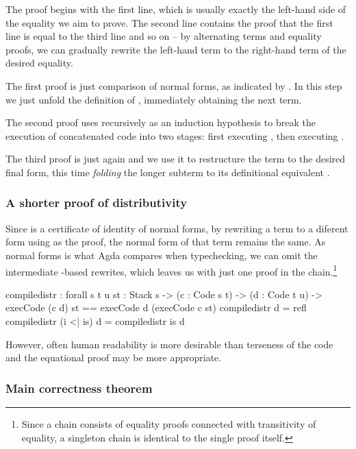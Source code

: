 \noindent The proof begins with the first line, which is usually exactly the
left-hand side of the equality we aim
to prove.  The second line contains the proof that the first line is equal to
the third line and so on -- by alternating terms and equality proofs, we can
gradually rewrite the left-hand term to the right-hand term of the desired
equality.

The first proof is just comparison of normal forms, as indicated by
. In this step we just unfold the definition of ,
immediately obtaining the next term.

The second proof uses  recursively as an induction
hypothesis to break the execution of concatenated code into two stages: first
executing , then executing .

The third proof is just  again and we use it to restructure the
term to the desired final form, this time \emph{folding} the longer
subterm to its definitional equivalent .

\subsubsection{A shorter proof of distributivity}

Since  is a certificate of identity of normal forms, by rewriting
a term to a diferent form using  as the proof, the normal form of
that term remains the same. As normal forms is what Agda compares when typechecking,
we can omit the intermediate -based rewrites, which leaves us
with just one proof in the chain.\footnote{Since a chain consists of equality
proofs connected with transitivity of equality, a singleton chain is identical
to the single proof itself.}

\begin{code}
  compile\-distr : forall {s t u} {st : Stack s}
    -> (c : Code s t) -> (d : Code t u)
    -> execCode (c \app d) st == execCode d (execCode c st)
  compile\-distr \nil d = refl
  compile\-distr (i <| is) d = compile\-distr is d
\end{code}

\noindent However, often human readability is more desirable than terseness of
the code and the equational proof may be more appropriate.

\subsubsection{Main correctness theorem}

